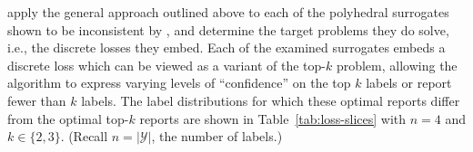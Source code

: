 \documentclass[11pt]{article}
\newcommand{\Comments}{1}
\newcommand{\mytodo}[2]{\ifnum\Comments=1%
  \todo[linecolor=#1!80!black,backgroundcolor=#1,bordercolor=#1!80!black]{#2}\fi}
\newcommand{\raft}[1]{\mytodo{green!20!white}{RF: #1}}
\newcommand{\jessiet}[1]{\mytodo{teal!20!white}{JF: #1}}
\newcommand{\Y}{\mathcal{Y}}
\begin{document}

\citet{finocchiaro2022consistenttopk} apply the general approach outlined above to each of the polyhedral surrogates shown to be inconsistent by \citeauthor{yang2018consistency}, and determine the target problems they do solve, i.e., the discrete losses they embed.
Each of the examined surrogates embeds a discrete loss which can be viewed as a variant of the top-$k$ problem, allowing the algorithm to express varying levels of ``confidence'' on the top $k$ labels or report fewer than $k$ labels.
The label distributions for which these optimal reports differ from the optimal top-$k$ reports are shown in Table~\ref{tab:loss-slices} with $n=4$ and $k \in \{2,3\}$.
(Recall $n=|\Y|$, the number of labels.)
\end{document}
